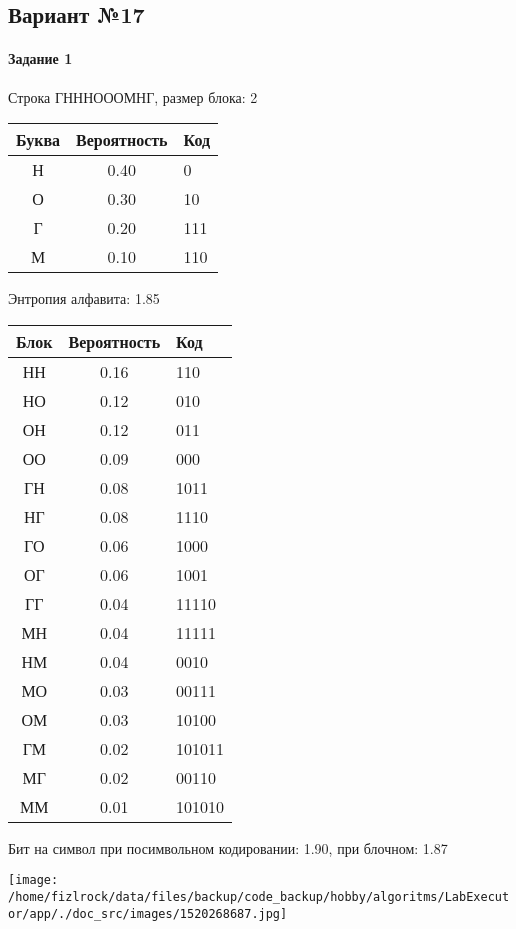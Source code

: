 \documentclass[a4paper, 12pt]{article}
\begin{document}
\subsection{Вариант №17}
\paragraph{Задание 1}

Строка ГНННОООМНГ, размер блока: 2
\begin{center}
 \begin{tabular}{ |c|c|l| } 
  \hline
     Буква & Вероятность & Код\\ \hline
Н & 0.40 & 0\\\hline
О & 0.30 & 10\\\hline
Г & 0.20 & 111\\\hline
М & 0.10 & 110
\\ \hline \end{tabular}
\end{center}
Энтропия алфавита: 1.85
\begin{center}
 \begin{tabular}{ |c|c|l| } 
  \hline
     Блок & Вероятность & Код\\ \hline
НН & 0.16 & 110\\\hline
НО & 0.12 & 010\\\hline
ОН & 0.12 & 011\\\hline
ОО & 0.09 & 000\\\hline
ГН & 0.08 & 1011\\\hline
НГ & 0.08 & 1110\\\hline
ГО & 0.06 & 1000\\\hline
ОГ & 0.06 & 1001\\\hline
ГГ & 0.04 & 11110\\\hline
МН & 0.04 & 11111\\\hline
НМ & 0.04 & 0010\\\hline
МО & 0.03 & 00111\\\hline
ОМ & 0.03 & 10100\\\hline
ГМ & 0.02 & 101011\\\hline
МГ & 0.02 & 00110\\\hline
ММ & 0.01 & 101010
\\ \hline \end{tabular}
\end{center}
Бит на символ при посимвольном кодировании: 1.90, при блочном: 1.87

\texttt{[image: /home/fizlrock/data/files/backup/code\_backup/hobby/algoritms/LabExecutor/app/./doc\_src/images/1520268687.jpg]}
\end{document}
